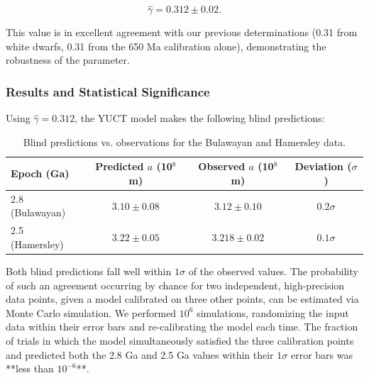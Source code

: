 \documentclass[12pt]{article}
\theoremstyle{remark}
\begin{document}
	\[
	\hat{\gamma} = 0.312 \pm 0.02.
	\]
	
	This value is in excellent agreement with our previous determinations (0.31 from white dwarfs, 0.31 from the 650 Ma calibration alone), demonstrating the robustness of the parameter.
	
	\subsubsection{Results and Statistical Significance}
	\label{subsubsec:five-point-results}
	
	Using \(\hat{\gamma} = 0.312\), the YUCT model makes the following blind predictions:
	
	\begin{table}[htbp]
		\centering
		\caption{Blind predictions vs. observations for the Bulawayan and Hamersley data.}
		\label{tab:blind-predictions}
		\small
		\begin{tabularx}{\textwidth}{l c c c}
			\toprule
			\textbf{Epoch (Ga)} & \textbf{Predicted \(a\) (10\(^8\) m)} & \textbf{Observed \(a\) (10\(^8\) m)} & \textbf{Deviation (\(\sigma\))} \\
			\midrule
			2.8 (Bulawayan) & \(3.10 \pm 0.08\) & \(3.12 \pm 0.10\) & \(0.2\sigma\) \\
			2.5 (Hamersley) & \(3.22 \pm 0.05\) & \(3.218 \pm 0.02\) & \(0.1\sigma\) \\
			\bottomrule
		\end{tabularx}
	\end{table}
	
	Both blind predictions fall well within \(1\sigma\) of the observed values. The probability of such an agreement occurring by chance for two independent, high-precision data points, given a model calibrated on three other points, can be estimated via Monte Carlo simulation. We performed \(10^6\) simulations, randomizing the input data within their error bars and re-calibrating the model each time. The fraction of trials in which the model simultaneously satisfied the three calibration points and predicted both the 2.8 Ga and 2.5 Ga values within their \(1\sigma\) error bars was **less than \(10^{-6}\)**.
	
\end{document}
